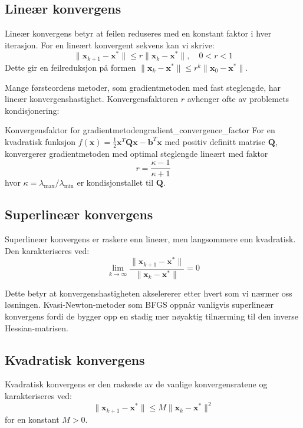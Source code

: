 \subsection{Lineær konvergens}

Lineær konvergens betyr at feilen reduseres med en konstant faktor i hver iterasjon. For en lineært konvergent sekvens kan vi skrive:
\[
	\|\symbf{x}_{k+1} - \symbf{x}^\ast\| \leq r \|\symbf{x}_k - \symbf{x}^\ast\|, \quad 0 < r < 1
\]
Dette gir en feilreduksjon på formen \(\|\symbf{x}_k - \symbf{x}^\ast\| \leq r^k \|\symbf{x}_0 - \symbf{x}^\ast\|\).

Mange førsteordens metoder, som gradientmetoden med fast steglengde, har lineær konvergenshastighet. Konvergensfaktoren \(r\) avhenger ofte av problemets kondisjonering:

\begin{proposition}{Konvergensfaktor for gradientmetoden}{gradient_convergence_factor}
	For en kvadratisk funksjon \(f(\symbf{x}) = \frac{1}{2}\symbf{x}^T\symbf{Q}\symbf{x} - \symbf{b}^T\symbf{x}\) med positiv definitt matrise \(\symbf{Q}\), konvergerer gradientmetoden med optimal steglengde lineært med faktor
	\[
		r = \frac{\kappa - 1}{\kappa + 1}
	\]
	hvor \(\kappa = \lambda_{\max}/\lambda_{\min}\) er kondisjonstallet til \(\symbf{Q}\).
\end{proposition}

\subsection{Superlineær konvergens}

Superlineær konvergens er raskere enn lineær, men langsommere enn kvadratisk. Den karakteriseres ved:
\[
	\lim_{k \to \infty} \frac{\|\symbf{x}_{k+1} - \symbf{x}^\ast\|}{\|\symbf{x}_k - \symbf{x}^\ast\|} = 0
\]

Dette betyr at konvergenshastigheten akselererer etter hvert som vi nærmer oss løsningen. Kvasi-Newton-metoder som BFGS oppnår vanligvis superlineær konvergens fordi de bygger opp en stadig mer nøyaktig tilnærming til den inverse Hessian-matrisen.

\subsection{Kvadratisk konvergens}

Kvadratisk konvergens er den raskeste av de vanlige konvergensratene og karakteriseres ved:
\[
	\|\symbf{x}_{k+1} - \symbf{x}^\ast\| \leq M \|\symbf{x}_k - \symbf{x}^\ast\|^2
\]
for en konstant \(M > 0\).


